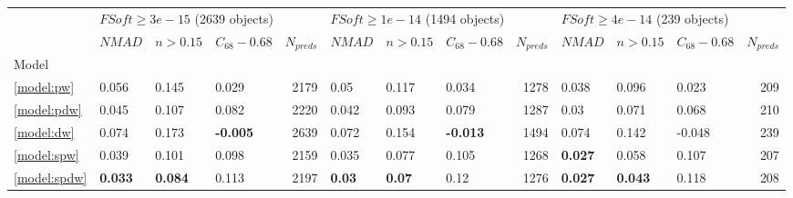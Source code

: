 \documentclass[fleqn,usenatbib]{mnras}
\begin{document}
\begin{table}
	\begin{tabular}{llllrlllrlllr}
            \hline
            {} & \multicolumn{4}{l}{$FSoft \geq 3e-15$ (2639 objects)} & \multicolumn{4}{l}{$FSoft \geq 1e-14$ (1494 objects)} & \multicolumn{4}{l}{$FSoft \geq 4e-14$ (239 objects)} \\
            {} &                            $NMAD$ &        $n>0.15$ &  $C_{68} - 0.68$ & $N_{preds}$ &                            $NMAD$ &       $n>0.15$ &  $C_{68} - 0.68$ & $N_{preds}$ &                           $NMAD$ &        $n>0.15$ &  $C_{68} - 0.68$ & $N_{preds}$ \\
            Model                               &                                   &                 &                  &             &                                   &                &                  &             &                                  &                 &                  &             \\
            \hline
            \ref{model:pw}                      &                             0.056 &           0.145 &            0.029 &        2179 &                              0.05 &          0.117 &            0.034 &        1278 &                            0.038 &           0.096 &            0.023 &         209 \\
            \ref{model:pdw}                     &                             0.045 &           0.107 &            0.082 &        2220 &                             0.042 &          0.093 &            0.079 &        1287 &                             0.03 &           0.071 &            0.068 &         210 \\
            \ref{model:dw}                      &                             0.074 &           0.173 &  \textbf{-0.005} &        2639 &                             0.072 &          0.154 &  \textbf{-0.013} &        1494 &                            0.074 &           0.142 &           -0.048 &         239 \\
            \ref{model:spw}                     &                             0.039 &           0.101 &            0.098 &        2159 &                             0.035 &          0.077 &            0.105 &        1268 &                   \textbf{0.027} &           0.058 &            0.107 &         207 \\
            \ref{model:spdw}                    &                    \textbf{0.033} &  \textbf{0.084} &            0.113 &        2197 &                     \textbf{0.03} &  \textbf{0.07} &             0.12 &        1276 &                   \textbf{0.027} &  \textbf{0.043} &            0.118 &         208 \\

\end{tabular}
\end{table}
\end{document}
